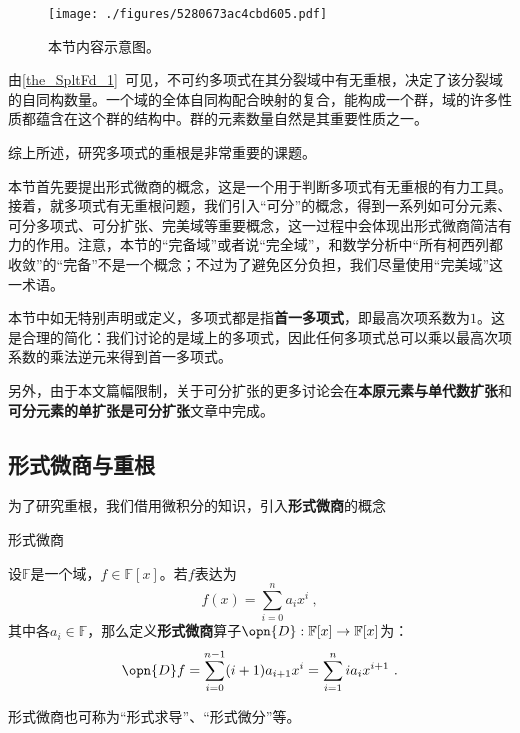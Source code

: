 



\begin{figure}[ht]
\centering
\texttt{[image: ./figures/5280673ac4cbd605.pdf]}
\caption{本节内容示意图。} \label{fig_SprbEx_1}
\end{figure}


由\autoref{the_SpltFd_1}~可见，不可约多项式在其分裂域中有无重根，决定了该分裂域的自同构数量。一个域的全体自同构配合映射的复合，能构成一个群，域的许多性质都蕴含在这个群的结构中。群的元素数量自然是其重要性质之一。

综上所述，研究多项式的重根是非常重要的课题。

本节首先要提出形式微商的概念，这是一个用于判断多项式有无重根的有力工具。接着，就多项式有无重根问题，我们引入“可分”的概念，得到一系列如可分元素、可分多项式、可分扩张、完美域等重要概念，这一过程中会体现出形式微商简洁有力的作用。注意，本节的“完备域”或者说“完全域”，和数学分析中“所有柯西列都收敛”的“完备”不是一个概念；不过为了避免区分负担，我们尽量使用“完美域”这一术语。

本节中如无特别声明或定义，多项式都是指\textbf{首一多项式}，即最高次项系数为$1$。这是合理的简化：我们讨论的是域上的多项式，因此任何多项式总可以乘以最高次项系数的乘法逆元来得到首一多项式。

另外，由于本文篇幅限制，关于可分扩张的更多讨论会在\textbf{本原元素与单代数扩张}和\textbf{可分元素的单扩张是可分扩张}文章中完成。

\subsection{形式微商与重根}

为了研究重根，我们借用微积分的知识，引入\textbf{形式微商}的概念

\begin{definition}{形式微商}\label{def_SprbEx_1}

设$\mathbb{F}$是一个域，$f\in\mathbb{F}[x]$。若$f$表达为
\begin{equation}
f(x) = \sum_{i=0}^n a_ix^i~,
\end{equation}
其中各$a_i\in\mathbb{F}$，那么定义\textbf{形式微商}算子$\opn{D}:\mathbb{F}[x]\to\mathbb{F}[x]$为：
\begin{equation}
\opn{D}f = \sum_{i=0}^{n-1} (i+1)a_{i+1}x^i = \sum_{i=1}^{n} ia_{i}x^{i+1}~.
\end{equation}

形式微商也可称为“形式求导”、“形式微分”等。

\end{definition}

